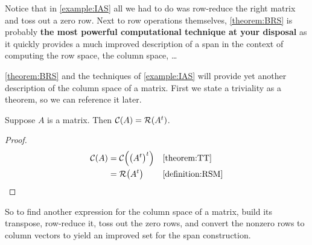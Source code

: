 \documentclass{ximera}
\begin{document}
Notice that in \ref{example:IAS} all we had to do was row-reduce the
right matrix and toss out a zero row.  Next to row operations
themselves, \ref{theorem:BRS} is probably \textbf{the most powerful
  computational technique at your disposal} as it quickly provides a
much improved description of a span in the context of computing the
row space, the column space, \ldots

\ref{theorem:BRS} and the techniques of \ref{example:IAS} will provide
yet another description of the column space of a matrix.  First we
state a triviality as a theorem, so we can reference it later.

\begin{theorem}
  \label{theorem:CSRST}

  Suppose $A$ is a matrix.  Then $\mathcal{C}\!\left(A\right)=\mathcal{R}\!\left(A^{t}\right)$.

  \begin{proof}
    \begin{align*}
      \mathcal{C}\!\left(A\right)
      &=\mathcal{C}\!\left(\left(A^{t}\right)^{t}\right)
      &&\ref{theorem:TT}\\
      &=\mathcal{R}\!\left(A^{t}\right)
      &&\ref{definition:RSM}
    \end{align*}
  \end{proof}
\end{theorem}

So to find another expression for the column space of a matrix, build
its transpose, row-reduce it, toss out the zero rows, and convert the
nonzero rows to column vectors to yield an improved set for the span
construction.
\end{document}
